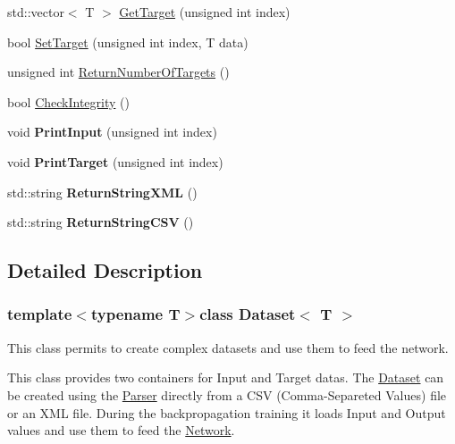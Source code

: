 \begin{DoxyCompactItemize}
\item 
std\-::vector$<$ T $>$ \hyperlink{class_dataset_ab72961bcb2ff0152977dbe1ae3ec670a}{Get\-Target} (unsigned int index)
\item 
bool \hyperlink{class_dataset_a04bb918c29600b1a681b5d079a941401}{Set\-Target} (unsigned int index, T data)
\item 
unsigned int \hyperlink{class_dataset_a8b77104d037f1895a15803a4d0d8c06b}{Return\-Number\-Of\-Targets} ()
\item 
bool \hyperlink{class_dataset_a672561f00cfd9018df2555974389b816}{Check\-Integrity} ()
\item 
\hypertarget{class_dataset_a7016d7ef7cabad560be6ded0232e0142}{void {\bfseries Print\-Input} (unsigned int index)}\label{class_dataset_a7016d7ef7cabad560be6ded0232e0142}

\item 
\hypertarget{class_dataset_a388aa8d7ad1bd2fb8a902e8900bfab46}{void {\bfseries Print\-Target} (unsigned int index)}\label{class_dataset_a388aa8d7ad1bd2fb8a902e8900bfab46}

\item 
\hypertarget{class_dataset_a7ff4595a70bce2e984e87b11211a436a}{std\-::string {\bfseries Return\-String\-X\-M\-L} ()}\label{class_dataset_a7ff4595a70bce2e984e87b11211a436a}

\item 
\hypertarget{class_dataset_acc5411ee1e5a7e47cb9f546523d40bb4}{std\-::string {\bfseries Return\-String\-C\-S\-V} ()}\label{class_dataset_acc5411ee1e5a7e47cb9f546523d40bb4}

\end{DoxyCompactItemize}


\subsection{Detailed Description}
\subsubsection*{template$<$typename T$>$class Dataset$<$ T $>$}

This class permits to create complex datasets and use them to feed the network. 

This class provides two containers for Input and Target datas. The \hyperlink{class_dataset}{Dataset} can be created using the \hyperlink{class_parser}{Parser} directly from a C\-S\-V (Comma-\/\-Separeted Values) file or an X\-M\-L file. During the backpropagation training it loads Input and Output values and use them to feed the \hyperlink{class_network}{Network}.

